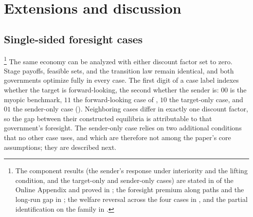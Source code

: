 \section{Extensions and discussion}
\label{sec:discussion}

\subsection{Single-sided foresight cases}
\label{sec:discussion:horizons}
\label{sec:four-regimes}

\footnote{The component results (the sender's response under
interiority and the lifting condition, and the target-only and sender-only cases) are stated
in  of the Online Appendix and proved in
; the foresight premium along paths and the long-run gap in
; the welfare reversal across the four cases in
, and the partial identification on the family in
.} The same economy can be analyzed with either discount factor set to
zero. Stage payoffs, feasible sets, and the transition law remain identical, and both
governments optimize fully in every case. The first digit of a case label indexes
whether the target is forward-looking, the second whether the sender is: $00$ is the
myopic benchmark, $11$ the forward-looking case of , $10$ the
target-only case, and $01$ the sender-only case (). Neighboring
cases differ in exactly one discount factor, so the gap between their constructed
equilibria is attributable to that government's foresight. The sender-only case relies
on two additional conditions that no other case uses, and which are therefore not among
the paper's core assumptions; they are described next.

